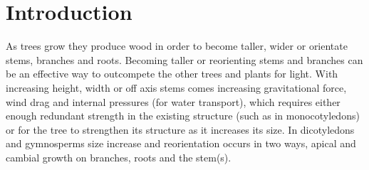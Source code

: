 \chapter{Introduction}
As trees grow they produce wood in order to become taller, wider or orientate
stems, branches and roots. Becoming taller or reorienting stems and branches can
be an effective way to outcompete the other trees and plants for light.
With increasing height, width or off axis stems comes increasing gravitational
force, wind drag and internal pressures (for water transport), which requires
either enough redundant strength in the existing structure (such as in
monocotyledons) or for the tree to strengthen its structure as it increases its
size. In dicotyledons and gymnosperms size increase and reorientation occurs in
two ways, apical and cambial growth on branches, roots and the stem(s).